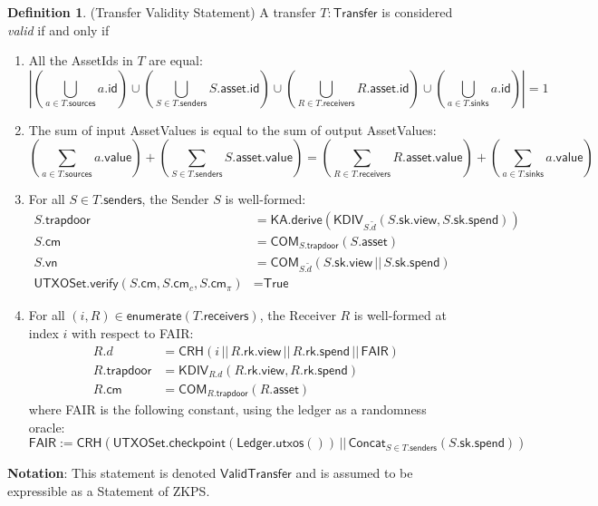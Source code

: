 \documentclass[a4paper]{article}
\theoremstyle{definition}
\newtheorem{definition}{Definition}[subsection]
\renewcommand{\abs}[1]{\left|#1\right|}
\newcommand{\AssetId}{{\textsf{AssetId}}}
\newcommand{\AssetValue}{{\textsf{AssetValue}}}
\newcommand{\COM}{{\textsf{COM}}}
\newcommand{\CRH}{{\textsf{CRH}}}
\newcommand{\Concat}{{\textsf{Concat}}}
\newcommand{\Enumerate}{{\textsf{enumerate}}}
\newcommand{\FAIR}{{\textsf{FAIR}}}
\newcommand{\ID}{{\textsf{id}}}
\newcommand{\KA}{{\textsf{KA}}}
\newcommand{\KDIV}{{\textsf{KDIV}}}
\newcommand{\Ledger}{{\textsf{Ledger}}}
\newcommand{\Receiver}{{\textsf{Receiver}}}
\newcommand{\Sender}{{\textsf{Sender}}}
\newcommand{\Statement}{{\textsf{Statement}}}
\newcommand{\Transfer}{{\textsf{Transfer}}}
\newcommand{\True}{{\textsf{True}}}
\newcommand{\UTXOSet}{{\textsf{UTXOSet}}}
\newcommand{\VALUE}{{\textsf{value}}}
\newcommand{\ValidTransfer}{{\textsf{ValidTransfer}}}
\newcommand{\ZKPS}{{\textsf{ZKPS}}}
\newcommand{\asset}{{\textsf{asset}}}
\newcommand{\checkpoint}{{\textsf{checkpoint}}}
\newcommand{\cm}{{\textsf{cm}}}
\newcommand{\derive}{{\textsf{derive}}}
\newcommand{\receivers}{{\textsf{receivers}}}
\newcommand{\rk}{{\textsf{rk}}}
\newcommand{\senders}{{\textsf{senders}}}
\newcommand{\sinks}{{\textsf{sinks}}}
\newcommand{\sk}{{\textsf{sk}}}
\newcommand{\sources}{{\textsf{sources}}}
\newcommand{\spend}{{\textsf{spend}}}
\newcommand{\trapdoor}{{\textsf{trapdoor}}}
\newcommand{\utxos}{{\textsf{utxos}}}
\newcommand{\verify}{{\textsf{verify}}}
\newcommand{\view}{{\textsf{view}}}
\newcommand{\vn}{{\textsf{vn}}}
\begin{document}
\begin{definition}(\Transfer{} Validity \Statement{}) A transfer $T : \Transfer$ is considered \emph{valid} if and only if
    \begin{enumerate}
        \item All the \AssetId{s} in $T$ are equal:
            \[
                \abs{
                    \left(\bigcup_{a \in T.\sources} a.\ID \right)
                    \cup
                    \left(\bigcup_{S \in T.\senders} S.\asset.\ID \right)
                    \cup
                    \left(\bigcup_{R \in T.\receivers} R.\asset.\ID \right)
                    \cup
                    \left(\bigcup_{a \in T.\sinks} a.\ID \right)
                } = 1
            \]
        \item The sum of input \AssetValue{s} is equal to the sum of output \AssetValue{s}:
            \[
                \left(\sum_{a \in T.\sources} a.\VALUE\right)
                +
                \left(\sum_{S \in T.\senders} S.\asset.\VALUE\right)
                =
                \left(\sum_{R \in T.\receivers} R.\asset.\VALUE\right)
                +
                \left(\sum_{a \in T.\sinks} a.\VALUE\right)
            \]
        \item For all $S \in T.\senders$, the \Sender{} $S$ is well-formed:
            \begin{align*}
                S.\trapdoor                                 &= \KA.\derive(\KDIV_{S.\tilde{d}}(S.\sk.\view, S.\sk.\spend)) \\
                S.\cm                                       &= \COM_{S.\trapdoor}(S.\asset) \\
                S.\vn                                       &= \COM_{S.\tilde{d}}(S.\sk.\view \,||\, S.\sk.\spend) \\
                \UTXOSet.\verify(S.\cm, S.\cm_c, S.\cm_\pi) &= \True
            \end{align*}
        \item For all $(i, R) \in \Enumerate(T.\receivers)$, the \Receiver{} $R$ is well-formed at index $i$ with respect to \FAIR{}:
            \begin{align*}
                R.d         &= \CRH(i \,||\, R.\rk.\view \,||\, R.\rk.\spend \,||\, \FAIR) \\
                R.\trapdoor &= \KDIV_{R.d}(R.\rk.\view, R.\rk.\spend) \\
                R.\cm       &= \COM_{R.\trapdoor}(R.\asset)
            \end{align*}
            where \FAIR{} is the following constant, using the ledger as a randomness oracle:
            \[\FAIR := \CRH(\UTXOSet.\checkpoint(\Ledger.\utxos()) \,||\, \Concat_{S \in T.\senders}(S.\sk.\spend))\]
    \end{enumerate}
    \textbf{Notation}: This statement is denoted $\ValidTransfer$ and is assumed to be expressible as a \Statement{} of \ZKPS{}.
\end{definition}
\end{document}
